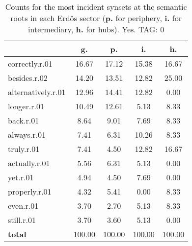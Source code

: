 \begin{table}[h!]
\begin{center}
\begin{tabular}{| l | c | c | c | c |}\hline
 & g. & p. & i. & h. \\\hline
correctly.r.01 & 16.67  & 17.12  & 15.38  & 16.67 \\\hline
besides.r.02 & 14.20  & 13.51  & 12.82  & 25.00 \\\hline
alternatively.r.01 & 12.96  & 14.41  & 12.82  & 0.00 \\\hline
longer.r.01 & 10.49  & 12.61  & 5.13  & 8.33 \\\hline
back.r.01 & 8.64  & 9.01  & 7.69  & 8.33 \\\hline
always.r.01 & 7.41  & 6.31  & 10.26  & 8.33 \\\hline
truly.r.01 & 7.41  & 4.50  & 12.82  & 16.67 \\\hline
actually.r.01 & 5.56  & 6.31  & 5.13  & 0.00 \\\hline
yet.r.01 & 4.94  & 4.50  & 7.69  & 0.00 \\\hline
properly.r.01 & 4.32  & 5.41  & 0.00  & 8.33 \\\hline
even.r.01 & 3.70  & 2.70  & 5.13  & 8.33 \\\hline
still.r.01 & 3.70  & 3.60  & 5.13  & 0.00 \\\hline
{{\bf total}} & 100.00  & 100.00  & 100.00  & 100.00 \\\hline
\end{tabular}
\caption{Counts for the most incident synsets at the semantic roots in each Erd\"os sector ({\bf p.} for periphery, {\bf i.} for intermediary, {\bf h.} for hubs). Yes. TAG: 0}
\end{center}
\end{table}